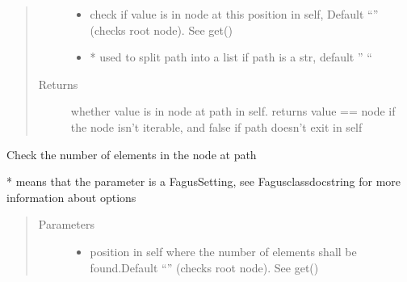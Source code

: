 \documentclass[a4paper,10pt,english]{sphinxmanual}
\begin{document}
\begin{fulllineitems}
\begin{fulllineitems}
\begin{quote}
\begin{description}
\begin{itemize}
\item {}
\sphinxAtStartPar
{} \textendash{} check if value is in node at this position in self, Default “” (checks root node). See get()

\item {}
\sphinxAtStartPar
{} \textendash{} * used to split path into a list if path is a str, default ” “

\end{itemize}

\item[{Returns}] \leavevmode
\sphinxAtStartPar
whether value is in node at path in self. returns value == node if the node isn’t iterable, and false if
path doesn’t exit in self

\end{description}\end{quote}

\end{fulllineitems}


\begin{fulllineitems}
\label{\detokenize{fagus.fagus:fagus.fagus.Fagus.count}}
\pysigstartsignatures
{}
\pysigstopsignatures
\sphinxAtStartPar
Check the number of elements in the node at path

\sphinxAtStartPar
* means that the parameter is a Fagus\sphinxhyphen{}Setting, see Fagus\sphinxhyphen{}class\sphinxhyphen{}docstring for more information about options
\begin{quote}\begin{description}
\item[{Parameters}] \leavevmode\begin{itemize}
\item {}
\sphinxAtStartPar
{} \textendash{} position in self where the number of elements shall be found.Default “” (checks root node). See get()


\end{itemize}
\end{description}
\end{quote}
\end{fulllineitems}
\end{fulllineitems}
\end{document}
